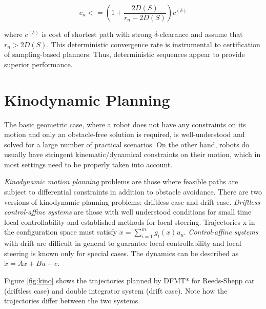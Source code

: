 \documentclass[twoside]{article}
\begin{document}
\begin{equation}
    c_n <= \left(1+\frac{2D(S)}{r_n-2D(S)}\right)c ^{(\delta)}
\end{equation}

where $c ^{(\delta)}$ is cost of shortest path with strong $\delta$-clearance and assume that $r_n > 2D(S)$. This deterministic convergence rate is instrumental to certification of sampling-based planners. Thus, deterministic sequences appear to provide superior performance.


\section{Kinodynamic Planning}
The  basic  geometric case,  where  a  robot  does  not  have  any constraints on its motion and only an obstacle-free solution is required, is well-understood and solved for a large number of practical scenarios. On the other hand, robots do usually have stringent  kinematic/dynamical constraints on their motion, which in most settings need to be properly taken into account.

\textit{Kinodynamic motion planning} problems are those where feasible paths are subject to differential constraints in addition to obstacle avoidance. There are two versions of kinodynamic planning problems: driftless case and drift case. \textit{Driftless control-affine systems} are those with well understood conditions for small time local controllability and established methods for local steering. Trajectories x in the configuration space must satisfy $\dot{x} = \sum_{i=1}^{m}g_i(x)u_u$. \textit{Control-affine systems} with drift are difficult in general to guarantee local controllability and local steering is known only for special cases. The dynamics can be described as $\dot{x} = Ax + Bu + c$.

Figure \ref{fig:kino} shows the trajectories planned by DFMT* for Reeds-Shepp car (driftless case) and double integrator system (drift case). Note how the trajectories differ between the two systems.
\end{document}
